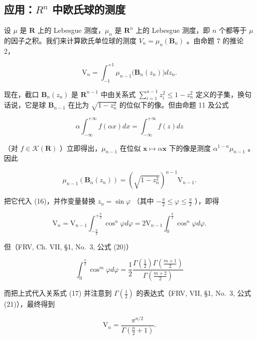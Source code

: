 \subsection{\texorpdfstring{应用：\(R^{n}\) 中欧氏球的测度}{应用：R to the n 中欧氏球的测度}}

设 \(\mu\) 是 \(\mathbf{R}\) 上的 Lebesgue 测度，\(\mu_n\) 是 \(\mathbf{R}^n\) 上的 Lebesgue 测度，即 \(n\) 个都等于 \(\mu\) 的因子之积。我们来计算欧氏单位球的测度 \(V_n = \mu_n(\mathbf{B}_n)\) 。由命题 7 的推论 2，

\[
\mathrm{V} _ {n} = \int_ {- 1} ^ {+ 1} \mu_ {n - 1} \big (\mathbf {B} _ {n} (z _ {n}) \big) d z _ {n}.\tag{16}
\]

现在，截口 \(\mathbf{B}_n(z_n)\) 是 \(\mathbf{R}^{n-1}\) 中由关系式 \(\sum_{i=1}^{n-1} z_i^2 \leqslant 1 - z_n^2\) 定义的子集，换句话说，它是球 \(\mathbf{B}_{n-1}\) 在比为 \(\sqrt{1 - z_n^2}\) 的位似下的像。但由命题 11 及公式

\[
\alpha \int_ {- \infty} ^ {+ \infty} f (\alpha x) d x = \int_ {- \infty} ^ {+ \infty} f (z) d z
\]

（对 \(f \in \mathcal{K}(\mathbf{R})\) ）立即得出，\(\mu_{n-1}\) 在位似 \(\mathbf{x} \mapsto \alpha \mathbf{x}\) 下的像是测度 \(\alpha^{1-n} \mu_{n-1}\) 。因此

\[
\mu_ {n - 1} \left(\mathbf {B} _ {n} \left(z _ {n}\right)\right) = \left(\sqrt {1 - z _ {n} ^ {2}}\right) ^ {n - 1} \mathrm{V} _ {n - 1}.
\]

把它代入 (16)，并作变量替换 \(z_{n} = \sin \varphi\) （其中 \(-\frac{\pi}{2} \leqslant \varphi \leqslant \frac{\pi}{2}\) ），即得

\[
\mathrm{V} _ {n} = \mathrm{V} _ {n - 1} \int_ {- \frac {\pi}{2}} ^ {+ \frac {\pi}{2}} \cos^ {n} \varphi d \varphi = 2 \mathrm{V} _ {n - 1} \int_ {0} ^ {\frac {\pi}{2}} \cos^ {n} \varphi d \varphi .\tag{17}
\]

但（FRV, Ch. VII, §1, No.~3, 公式 (20)）

\[
\int_ {0} ^ {\frac {\pi}{2}} \cos^ {m} \varphi d \varphi = \frac {1}{2} \frac {\Gamma \left(\frac {1}{2}\right) \Gamma \left(\frac {m + 1}{2}\right)}{\Gamma \left(\frac {m + 2}{2}\right)}
\]

而把上式代入关系式 (17) 并注意到 \(\Gamma(\frac{1}{2})\) 的表达式（FRV, VII, §1, No.~3, 公式 (21)），最终得到

\[
\mathrm{V} _ {n} = \frac {\pi^ {n / 2}}{\Gamma \left(\frac {n}{2} + 1\right)}.\tag{18}
\]

